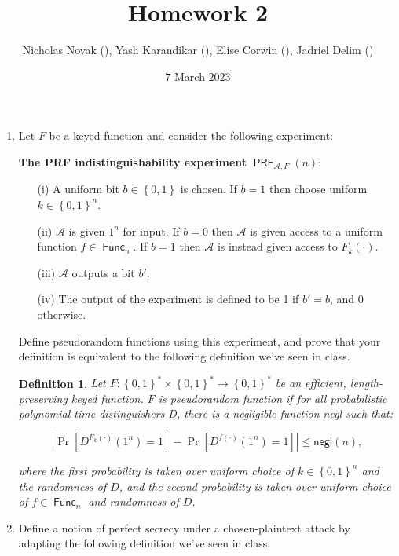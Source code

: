 \documentclass{article}
\title{Homework 2}
\date{7 March 2023}
\author{Nicholas Novak (), Yash Karandikar (),
Elise Corwin (), Jadriel Delim ()}
\newtheorem{definition}{Definition}
\DeclareMathOperator{\PRF}{\textsf{PRF}}
\DeclareMathOperator{\Func}{\textsf{Func}}
\begin{document}
\maketitle

\begin{enumerate}
  \item Let $F$ be a keyed function and consider the following experiment:

    \textbf{The PRF indistinguishability experiment} $\PRF_{\mathcal{A},
    F}(n)$:

    \begin{enumerate}
      \item[(i)] A uniform bit $b \in \left\{0, 1\right\}$ is chosen. If $b = 1$ then
        choose uniform $k \in \left\{0, 1\right\}^n$.
      \item[(ii)] $\mathcal{A}$ is given $1^n$ for input. If $b = 0$ then
        $\mathcal{A}$ is given access to a uniform function $f \in
        \Func_n$. If $b = 1$ then $\mathcal{A}$ is instead given access to
        $F_k(\cdot)$.
      \item[(iii)] $\mathcal{A}$ outputs a bit $b'$.
      \item[(iv)] The output of the experiment is defined to be 1 if $b' = b$, and $0$
        otherwise.
    \end{enumerate}

    Define pseudorandom functions using this experiment, and prove that your
    definition is equivalent to the following definition we've seen in class.

    \begin{definition}
      Let $F : \left\{0, 1\right\}^* \times \left\{0, 1\right\}^* \to \left\{0,
      1\right\}^*$ \textit{be an efficient, length-preserving keyed function.}
      $F$ \textit{is \textsf{pseudorandom function} if for all probabilistic
        polynomial-time distinguishers D, there is a negligible function
      \textsf{negl} such that:}

      \[
        \left| \Pr\left[D^{F_k(\cdot)}(1^n) = 1\right] -
      \Pr\left[D^{f(\cdot)}(1^n) = 1\right] \right| \leq \textsf{negl}(n),
      \]

      \textit{where the first probability is taken over uniform choice of $k \in
        \left\{0, 1\right\}^n$ and the randomness of $D$, and the second
        probability is taken over uniform choice of $f \in \Func_n$ and
      randomness of $D$.}
    \end{definition}
  \item Define a notion of perfect secrecy under a chosen-plaintext attack by
    adapting the following definition we've seen in class.


\end{enumerate}
\end{document}
